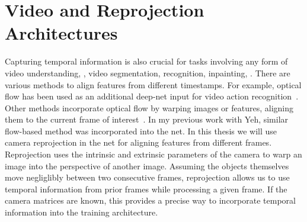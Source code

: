 \section{Video and Reprojection Architectures}
Capturing temporal information is also crucial for tasks involving any form of video understanding, \eg, video segmentation, recognition, inpainting, \etc. There are various methods to align features from different timestamps. For example, optical flow has been used as an additional deep-net input for video action recognition~\cite{simonyan2014two, singh2016first}. Other methods incorporate optical flow by warping images or features, aligning them to the current frame of interest~\cite{hu2017maskrnn,gadde2017semantic, kim2019deep}. In my previous work with Yeh, similar flow-based method was incorporated into the net. In this thesis we will use camera reprojection in the net for aligning features from different frames. Reprojection uses the intrinsic and extrinsic parameters of the camera to warp an image into the perspective of another image. Assuming the objects themselves move negliglibly between two consecutive frames, reprojection allows us to use temporal information from prior frames while processing a given frame. If the camera matrices are known, this provides a precise way to incorporate temporal information into the training architecture.
